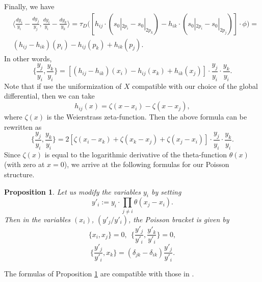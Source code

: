 \documentclass[reqno]{amsart}
\newtheorem{prop}[theorem]{Proposition}
\theoremstyle{definition}
\theoremstyle{remark}
\renewcommand{\th}{\theta}
\newcommand{\de}{\delta}
\newcommand{\lan}{\langle}
\newcommand{\ran}{\rangle}
\numberwithin{equation}{section}
\begin{document}
Finally, we have
\begin{align*}
&\lan \frac{dy_i}{y_i}-\frac{dy_j}{y_j}, \frac{dy_i}{y_i}-\frac{dy_k}{y_k}\ran=
\tau_D\bigl([h_{ij}\cdot (s_0|_{2p_i}-s_0|_{2p_k})-h_{ik}\cdot (s_0|_{2p_i}-s_0|_{2p_j})]\cdot\phi\bigr)=\\
&(h_{ij}-h_{ik})(p_i)-h_{ij}(p_k)+h_{ik}(p_j).
\end{align*}
In other words,
$$\{\frac{y_j}{y_i},\frac{y_k}{y_i}\}=[(h_{ij}-h_{ik})(x_i)-h_{ij}(x_k)+h_{ik}(x_j)]\cdot \frac{y_j}{y_i}\cdot\frac{y_k}{y_i}.$$
Note that if use the uniformization of $X$ compatible with our choice of the global differential, then we can take
$$h_{ij}(x)=\zeta(x-x_i)-\zeta(x-x_j),$$
where $\zeta(x)$ is the Weierstrass zeta-function.
Then the above formula can be rewritten as
$$\{\frac{y_j}{y_i},\frac{y_k}{y_i}\}=2[\zeta(x_i-x_k)+\zeta(x_k-x_j)+\zeta(x_j-x_i)]\cdot \frac{y_j}{y_i}\cdot\frac{y_k}{y_i}.$$
Since $\zeta(x)$ is equal to the logarithmic derivative of the theta-function $\th(x)$ (with zero at $x=0$), we arrive at the following formulas for our Poisson structure.

\begin{prop}\label{Pois-br-bos-coord-prop}
Let us modify the variables $y_i$ by setting
$$y'_i:=y_i\cdot \prod_{j\neq i}\th(x_j-x_i).$$
Then in the variables $(x_i)$, $(y'_j/y'_i)$, the Poisson bracket is given by
$$\{x_i,x_j\}=0, \ \ \{\frac{y'_j}{y'_i},\frac{y'_k}{y'_i}\}=0,$$
$$\{\frac{y'_j}{y'_i},x_k\}=(\de_{jk}-\de_{ik})\frac{y'_j}{y'_i}.$$
\end{prop}

The formulas of Proposition \ref{Pois-br-bos-coord-prop} are compatible with those in \cite{Ode02}.

 
\end{document}
